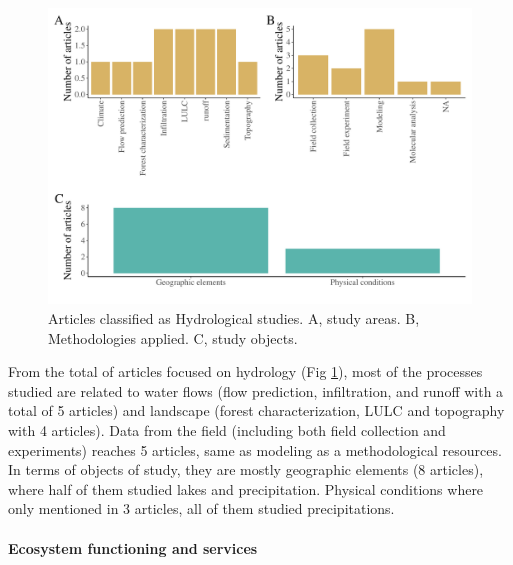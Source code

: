 \documentclass[]{article}
\let\oldparagraph\paragraph
\renewcommand{\paragraph}[1]{\oldparagraph{#1}\mbox{}}
\begin{document}
\begin{figure}
\centering
\includegraphics{Review_and_climate_files/figure-latex/Hydrology-1.pdf}
\caption{\label{fig:Hydrology}Articles classified as Hydrological studies. A, study areas. B, Methodologies applied. C, study objects.}
\end{figure}

From the total of articles focused on hydrology (Fig \ref{fig:Hydrology}), most of the processes studied are related to water flows (flow prediction, infiltration, and runoff with a total of 5 articles) and landscape (forest characterization, LULC and topography with 4 articles).
Data from the field (including both field collection and experiments) reaches 5 articles, same as modeling as a methodological resources.
In terms of objects of study, they are mostly geographic elements (8 articles), where half of them studied lakes and precipitation. Physical conditions where only mentioned in 3 articles, all of them studied precipitations.

\hypertarget{ecosystem-functioning-and-services}{%
\paragraph{Ecosystem functioning and services}\label{ecosystem-functioning-and-services}}
\end{document}
